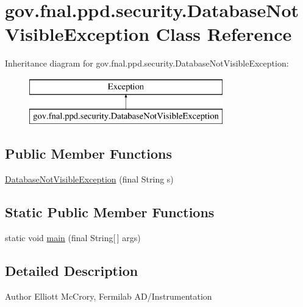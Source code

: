 \hypertarget{classgov_1_1fnal_1_1ppd_1_1security_1_1DatabaseNotVisibleException}{\section{gov.\-fnal.\-ppd.\-security.\-Database\-Not\-Visible\-Exception Class Reference}
\label{classgov_1_1fnal_1_1ppd_1_1security_1_1DatabaseNotVisibleException}
}
Inheritance diagram for gov.\-fnal.\-ppd.\-security.\-Database\-Not\-Visible\-Exception\-:\begin{figure}[H]
\begin{center}
\leavevmode
\includegraphics[height=2.000000cm]{classgov_1_1fnal_1_1ppd_1_1security_1_1DatabaseNotVisibleException}
\end{center}
\end{figure}
\subsection*{Public Member Functions}
\begin{DoxyCompactItemize}
\item 
\hyperlink{classgov_1_1fnal_1_1ppd_1_1security_1_1DatabaseNotVisibleException_a32f650c9cc95fb8fe0951d92a68c8069}{Database\-Not\-Visible\-Exception} (final String s)
\end{DoxyCompactItemize}
\subsection*{Static Public Member Functions}
\begin{DoxyCompactItemize}
\item 
static void \hyperlink{classgov_1_1fnal_1_1ppd_1_1security_1_1DatabaseNotVisibleException_a82075ee14623f4d7eca9f622a8551e2f}{main} (final String\mbox{[}$\,$\mbox{]} args)
\end{DoxyCompactItemize}


\subsection{Detailed Description}
\begin{DoxyAuthor}{Author}
Elliott Mc\-Crory, Fermilab A\-D/\-Instrumentation 
\end{DoxyAuthor}


